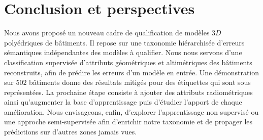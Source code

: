 \documentclass[a4paper,french]{article}
\begin{document}
    \section{Conclusion et perspectives}

    Nous avons proposé un nouveau cadre de qualification de modèles $3D$ polyédriques de bâtiments. Il repose sur une taxonomie hiérarchisée d'erreurs sémantiques indépendantes des modèles à qualifier. Nous nous servons d'une classification supervisée d'attributs géométriques et altimétriques des bâtiments reconstruits, afin de prédire les erreurs d'un modèle en entrée. Une démonstration sur $502$ bâtiments donne des résultats mitigés pour des étiquettes qui sont sous représentées. La prochaine étape consiste à ajouter des attributs radiométriques ainsi qu'augmenter la base d'apprentissage puis d'étudier {\color{red}l'apport de chaque amélioration}. Nous envisageons, enfin, d'explorer l'apprentissage non supervisé ou une approche semi-supervisée afin d'enrichir notre taxonomie et de propager les prédictions sur d'autres zones jamais vues.

    
    \begin{spacing}{0.01}
        
    \end{spacing}
\end{document}
